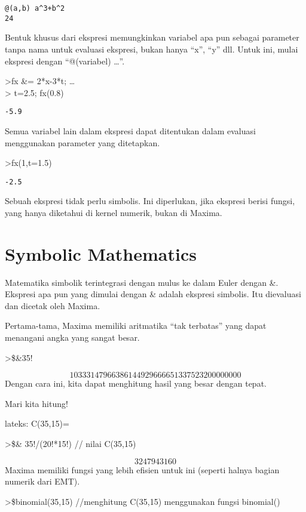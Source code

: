 \documentclass[
]{book}
\begin{document}
\begin{verbatim}
@(a,b) a^3+b^2
24
\end{verbatim}

Bentuk khusus dari ekspresi memungkinkan variabel apa pun sebagai parameter tanpa nama untuk evaluasi ekspresi, bukan hanya ``x'', ``y'' dll. Untuk ini, mulai ekspresi dengan ``@(variabel) \ldots{}''.

\textgreater fx \&= 2*x-3*t; \ldots{}\\
\textgreater{} t=2.5; fx(0.8)

\begin{verbatim}
-5.9
\end{verbatim}

Semua variabel lain dalam ekspresi dapat ditentukan dalam evaluasi menggunakan parameter yang ditetapkan.

\textgreater fx(1,t=1.5)

\begin{verbatim}
-2.5
\end{verbatim}

Sebuah ekspresi tidak perlu simbolis. Ini diperlukan, jika ekspresi berisi fungsi, yang hanya diketahui di kernel numerik, bukan di Maxima.

\section{Symbolic Mathematics}\label{symbolic-mathematics}

Matematika simbolik terintegrasi dengan mulus ke dalam Euler dengan \&. Ekspresi apa pun yang dimulai dengan \& adalah ekspresi simbolis. Itu dievaluasi dan dicetak oleh Maxima.

Pertama-tama, Maxima memiliki aritmatika ``tak terbatas'' yang dapat menangani angka yang sangat besar.

\textgreater\$\&35!

\[10333147966386144929666651337523200000000\]Dengan cara ini, kita dapat menghitung hasil yang besar dengan tepat.

Mari kita hitung!

lateks: C(35,15)=

\textgreater\$\& 35!/(20!*15!) // nilai C(35,15)

\[3247943160\]Maxima memiliki fungsi yang lebih efisien untuk ini (seperti halnya bagian numerik dari EMT).

\textgreater\$binomial(35,15) //menghitung C(35,15) menggunakan fungsi binomial()
\end{document}
